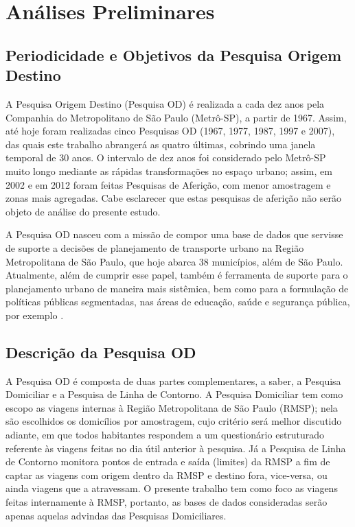 \chapter{Análises Preliminares}\label{chap:analises-preliminares}

\section{Periodicidade e Objetivos da Pesquisa Origem Destino}\label{sec:period-obj}

A Pesquisa Origem Destino (Pesquisa OD) é realizada a cada dez anos pela Companhia do Metropolitano de São Paulo (Metrô-SP), a partir de 1967. Assim, até hoje foram realizadas cinco Pesquisas OD (1967, 1977, 1987, 1997 e 2007), das quais este trabalho abrangerá as quatro últimas, cobrindo uma janela temporal de 30 anos. O intervalo de dez anos foi considerado pelo Metrô-SP muito longo mediante as rápidas transformações no espaço urbano; assim, em 2002 e em 2012 foram feitas Pesquisas de Aferição, com menor amostragem e zonas mais agregadas. Cabe esclarecer que estas pesquisas de aferição não serão objeto de análise do presente estudo.

A Pesquisa OD nasceu com a missão de compor uma base de dados que servisse de suporte a decisões de planejamento de transporte urbano na Região Metropolitana de São Paulo, que hoje abarca 38 municípios, além de São Paulo. Atualmente, além de cumprir esse papel, também é ferramenta de suporte para o planejamento urbano de maneira mais sistêmica, bem como para a formulação de políticas públicas segmentadas, nas áreas de educação, saúde e segurança pública, por exemplo \cite{MANUALOD2007}.

\section{Descrição da Pesquisa OD}\label{sec:descricao-OD}

A Pesquisa OD é composta de duas partes complementares, a saber, a Pesquisa Domiciliar e a Pesquisa de Linha de Contorno. A Pesquisa Domiciliar tem como escopo as viagens internas à Região Metropolitana de São Paulo (RMSP); nela são escolhidos os domicílios por amostragem, cujo critério será melhor discutido adiante, em que todos habitantes respondem a um questionário estruturado referente às viagens feitas no dia útil anterior à pesquisa. Já a Pesquisa de Linha de Contorno monitora pontos de entrada e saída (limites) da RMSP a fim de captar as viagens com origem dentro da RMSP e destino fora, vice-versa, ou ainda viagens que a atravessam. O presente trabalho tem como foco as viagens feitas internamente à RMSP, portanto, as bases de dados consideradas serão apenas aquelas advindas das Pesquisas Domiciliares.

